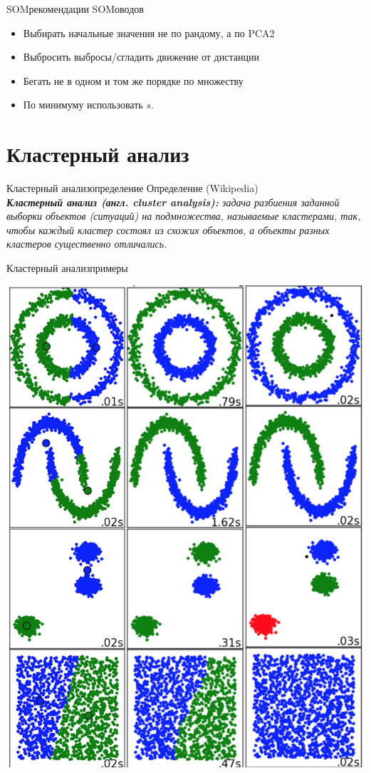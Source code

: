 \documentclass[14pt, fleqn, xcolor={dvipsnames, table}]{beamer}
\begin{document}
\begin{frame}{SOM}{рекомендации SOMоводов}
\begin{itemize}
  \item Выбирать начальные значения не по рандому, а по PCA2
  \item Выбросить выбросы/сгладить движение от дистанции
  \item Бегать не в одном и том же порядке по множеству
  \item По минимуму использовать $s$.
\end{itemize}
\end{frame}

\section{Кластерный анализ}

\begin{frame}{Кластерный анализ}{определение}
{\color{blue}Определение (Wikipedia)} \\

\textit{\textbf{Кластерный анализ (англ. cluster analysis): }задача разбиения заданной выборки объектов (ситуаций) на подмножества, называемые кластерами, так, чтобы каждый кластер состоял из схожих объектов, а объекты разных кластеров существенно отличались.}
\end{frame}

\begin{frame}{Кластерный анализ}{примеры }
\begin{center}\includegraphics[height=0.7\textheight]{methods.png}\end{center}
\end{frame}
\end{document}
